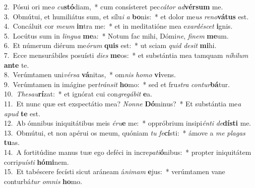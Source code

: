 {2.~}Pósui ori me\textit{o} \textit{cu}\textbf{stó}diam,~* cum consísteret pec\textit{cá}\textit{tor} \textit{ad}\textbf{vér}\textbf{sum} me.\\
{3.~}Obmútui, et humiliátus sum, et sílu\textit{i} \textit{a} \textbf{bo}nis:~* et dolor me\textit{us} \textit{re}\textit{no}\textbf{vá}\textbf{tus} est.\\
{4.~}Concáluit cor \textit{me}\textit{um} \textbf{in}tra me:~* et in meditatióne mea e\textit{xar}\textit{dé}\textit{scet} \textbf{i}gnis.\\
{5.~}Locútus sum in \textit{lin}\textit{gua} \textbf{me}a:~* Notum fac mihi, Dómi\textit{ne}, \textit{fi}\textit{nem} \textbf{me}um.\\
{6.~}Et númerum diérum me\textit{ó}\textit{rum} \textbf{quis} est:~* ut sciam \textit{quid} \textit{de}\textit{sit} \textbf{mi}hi.\\
{7.~}Ecce mensurábiles posuísti \textit{di}\textit{es} \textbf{me}os:~* et substántia mea tamquam \textit{ní}\textit{hi}\textit{lum} \textbf{an}\textbf{te} te.\\
{8.~}Verúmtamen uni\textit{vér}\textit{sa} \textbf{vá}nitas,~* om\textit{nis} \textit{ho}\textit{mo} \textbf{vi}vens.\\
{9.~}Verúmtamen in imágine per\textit{trán}\textit{sit} \textbf{ho}mo:~* sed et fru\textit{stra} \textit{con}\textit{tur}\textbf{bá}tur.\\
{10.~}\textit{The}\textit{sau}\textbf{rí}zat:~* et ignórat cui con\textit{gre}\textit{gá}\textit{bit} \textbf{e}a.\\
{11.~}Et nunc quæ est exspectátio mea? \textit{Non}\textit{ne} \textbf{Dó}minus?~* Et substántia me\textit{a} \textit{a}\textit{pud} \textbf{te} est.\\
{12.~}Ab ómnibus iniquitátibus meis \textit{é}\textit{ru}\textbf{e} me:~* oppróbrium insipi\textit{én}\textit{ti} \textit{de}\textbf{dí}\textbf{sti} me.\\
{13.~}Obmútui, et non apérui os meum, quóniam \textit{tu} \textit{fe}\textbf{cí}sti:~* ámove a \textit{me} \textit{pla}\textit{gas} \textbf{tu}as.\\
{14.~}A fortitúdine manus tuæ ego deféci in incre\textit{pa}\textit{ti}\textbf{ó}nibus:~* propter iniquitátem corri\textit{pu}\textit{í}\textit{sti} \textbf{hó}\textbf{mi}nem.\\
{15.~}Et tabéscere fecísti sicut aráneam á\textit{ni}\textit{mam} \textbf{e}jus:~* verúmtamen vane conturbá\textit{tur} \textit{om}\textit{nis} \textbf{ho}mo.\\
